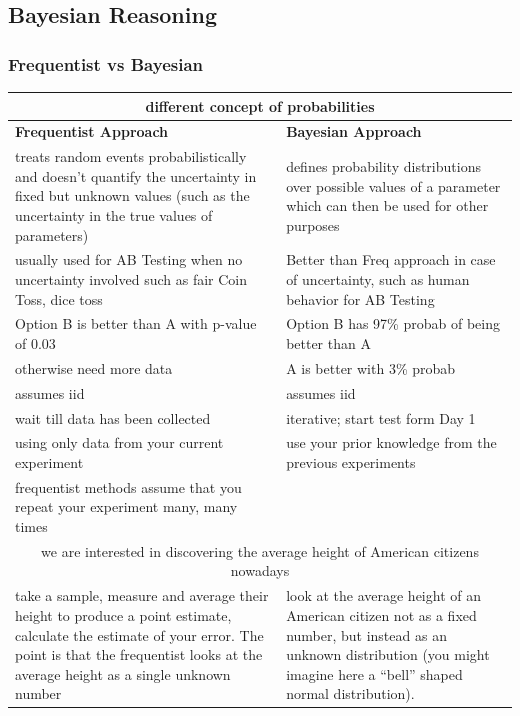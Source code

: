 \documentclass{beamer}
\begin{document}
\subsection{Bayesian Reasoning}

\begin{frame}[allowframebreaks]\frametitle{Frequentist vs Bayesian}

	\begin{table}
	\begin{tabular}{l|l}
		\multicolumn{2}{c}{different concept of probabilities}
		\\ \hline
		
		\textbf{Frequentist Approach} & \textbf{Bayesian Approach}
		\\ \hline
		treats random events probabilistically and doesn’t quantify the uncertainty in fixed but unknown values (such as the uncertainty in the true values of parameters)
		& defines probability distributions over possible values of a parameter which can then be used for other purposes
		\\ \hline
		usually used for AB Testing when no uncertainty involved such as fair Coin Toss, dice toss
		& Better than Freq approach in case of uncertainty, such as human behavior for AB Testing
		\\ \hline
		Option B is better than A with p-value of 0.03
		& Option B has 97\% probab of being better than A
		\\ \hline
		otherwise need more data
		& A is better with 3\% probab
		\\ \hline
		assumes iid
		& assumes iid
		\\ \hline
		wait till data has been collected
		& iterative; start test form Day 1
		\\ \hline
		using only data from your current experiment
		& use your prior knowledge from the previous experiments
		\\ \hline
		frequentist methods assume that you repeat your experiment many, many times & 
		\\ \hline
		\multicolumn{2}{c}{we are interested in discovering the average height of American citizens nowadays}\\
		take a sample, measure and average their height to produce a point estimate, calculate the estimate of your error. The point is that the frequentist looks at the average height as a single unknown number
		& look at the average height of an American citizen not as a fixed number, but instead as an unknown distribution (you might imagine here a “bell” shaped normal distribution).
		\\ \hline
	\end{tabular}
	\end{table}


\end{frame}
\end{document}
